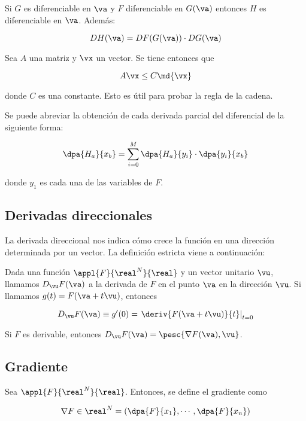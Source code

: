 \documentclass[12pt,a4paper,titlepage]{apuntes}
\begin{document}
\begin{theorem}
Si $G$ es diferenciable en $\va$ y $F$ diferenciable en $G(\va)$ entonces $H$ es diferenciable en $\va$. Además:

\[DH (\va) = DF(G(\va))\cdot DG(\va) \]
\end{theorem}

\begin{theorem}
Sea $A$ una matriz y $\vx$ un vector. Se tiene entonces que 

\[ A\vx \leq C\md{\vx} \]

donde $C$ es una constante. Esto es útil para probar la regla de la cadena.
\end{theorem}

Se puede abreviar la obtención de cada derivada parcial del diferencial de la siguiente forma:

\[ \dpa{H_a}{x_b} = \sum_{i=0}^M\dpa{H_a}{y_i}\cdot \dpa{y_i}{x_b} \]


donde $y_1$ es cada una de las variables de $F$.

\subsection{Derivadas direccionales}

La derivada direccional nos indica cómo crece la función en una dirección determinada por un vector. La definición estricta viene a continuación:
\begin{defn}
Dada una función $\appl{F}{\real^N}{\real}$ y un vector unitario $\vu$, llamamos $D_{\vu} F(\va)$ a la derivada de $F$ en el punto $\va$ en la dirección $\vu$. Si llamamos $g(t) = F(\va + t\vu)$, entonces

\[ D_{\vu} F(\va) \equiv g'(0) = \left.\deriv{F(\va + t\vu)}{t}\right|_{t=0} \]
\end{defn}

\begin{theorem}
Si $F$ es derivable, entonces $D_{\vu} F(\va) = \pesc{\nabla F(\va), \vu}$.
\end{theorem}

\subsection{Gradiente}
\begin{defn}[Gradiente]
Sea $\appl{F}{\real^N}{\real}$. Entonces, se define el gradiente como 

\[ \nabla F \in \real^N = \left(\dpa{F}{x_1},\cdots,\dpa{F}{x_n}\right) \]
\end{defn}
\end{document}
